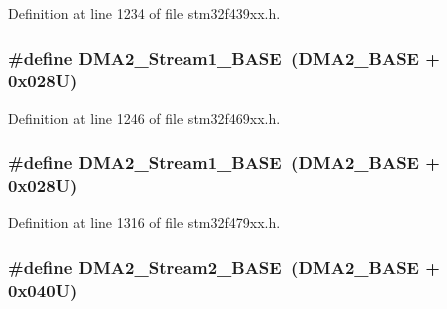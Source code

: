 Definition at line 1234 of file stm32f439xx.\+h.

\subsubsection[{\texorpdfstring{D\+M\+A2\+\_\+\+Stream1\+\_\+\+B\+A\+SE}{DMA2_Stream1_BASE}}]{\setlength{\rightskip}{0pt plus 5cm}\#define D\+M\+A2\+\_\+\+Stream1\+\_\+\+B\+A\+SE~({\bf D\+M\+A2\+\_\+\+B\+A\+SE} + 0x028\+U)}\hypertarget{group___peripheral__memory__map_ga35512bdc3f5e9df4557c2fbe7935d0b1}{}\label{group___peripheral__memory__map_ga35512bdc3f5e9df4557c2fbe7935d0b1}


Definition at line 1246 of file stm32f469xx.\+h.

\subsubsection[{\texorpdfstring{D\+M\+A2\+\_\+\+Stream1\+\_\+\+B\+A\+SE}{DMA2_Stream1_BASE}}]{\setlength{\rightskip}{0pt plus 5cm}\#define D\+M\+A2\+\_\+\+Stream1\+\_\+\+B\+A\+SE~({\bf D\+M\+A2\+\_\+\+B\+A\+SE} + 0x028\+U)}\hypertarget{group___peripheral__memory__map_ga35512bdc3f5e9df4557c2fbe7935d0b1}{}\label{group___peripheral__memory__map_ga35512bdc3f5e9df4557c2fbe7935d0b1}


Definition at line 1316 of file stm32f479xx.\+h.

\subsubsection[{\texorpdfstring{D\+M\+A2\+\_\+\+Stream2\+\_\+\+B\+A\+SE}{DMA2_Stream2_BASE}}]{\setlength{\rightskip}{0pt plus 5cm}\#define D\+M\+A2\+\_\+\+Stream2\+\_\+\+B\+A\+SE~({\bf D\+M\+A2\+\_\+\+B\+A\+SE} + 0x040\+U)}\hypertarget{group___peripheral__memory__map_gaed33a06f08188466f2ede06160984e9a}{}\label{group___peripheral__memory__map_gaed33a06f08188466f2ede06160984e9a}


